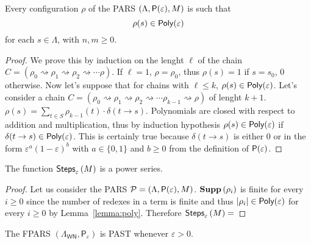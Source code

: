 \begin{lemma}\label{lemma:poly}
	Every configuration $\rho$ of the PARS $\left(\Lambda,\mathsf{P}(\varepsilon),M\right)$ is such that
	$$
	\rho(s)\in \textsf{Poly}(\varepsilon)
	$$
	for each $s\in\Lambda$, with $n,m\geq 0$.
\end{lemma}
\begin{proof}
	We prove this by induction on the lenght $\ell$ of the chain $C=\left( \rho_0\rightsquigarrow\rho_1\rightsquigarrow\rho_2\rightsquigarrow\cdots\rho\right)$. If $\ell=1$, $\rho=\rho_0$, thus $\rho(s)=1$ if $s=s_0$, $0$ otherwise. Now let's suppose that for chains with $\ell\leq k$, $\rho(s)\in \textsf{Poly}(\varepsilon)$. Let's consider a chain $C=\left( \rho_0\rightsquigarrow\rho_1\rightsquigarrow \rho_2\rightsquigarrow\cdots\rho_{k-1}\rightsquigarrow\rho\right)$ of lenght $k+1$. $\rho(s)=\underset{t\in S}{\sum}\rho_{k-1}\left( t\right) \cdot\delta\left(t \rightarrow s\right)$. Polynomials are closed with respect to addition and multiplication, thus by induction hypothesis $\rho(s)\in\textsf{Poly}(\varepsilon)$ if $\delta(t\rightarrow s)\in\textsf{Poly}(\varepsilon)$. This is certainly true because $\delta(t\rightarrow s)$ is either $0$ or in the form $\varepsilon^a(1-\varepsilon)^b$ with $a\in\{0,1\}$ and $b\geq 0$ from the definition of $\mathsf{P}(\varepsilon)$.
\end{proof}
\begin{theorem}
	The function $\textsf{Steps}_{\varepsilon}\left(M\right)$ is a power series.
\end{theorem}
\begin{proof}
	Let us consider the PARS $\mathcal{P}=\left(\Lambda,\mathsf{P}(\varepsilon),M\right)$. $\textbf{Supp}\left(\rho_i\right)$
	is finite for every $i\geq 0$ since the number of redexes in a term is finite and thus $|\rho_i|\in\textsf{Poly}(\varepsilon)$ for every $i\geq 0$ by Lemma~\ref{lemma:poly}. Therefore $\textsf{Steps}_{\varepsilon} \left(M\right)=$ %
\end{proof}
\begin{theorem}
	The FPARS $(\Lambda_\mathsf{WN},\mathsf{P}_\varepsilon)$ is PAST whenever $\varepsilon>0$.
\end{theorem}
